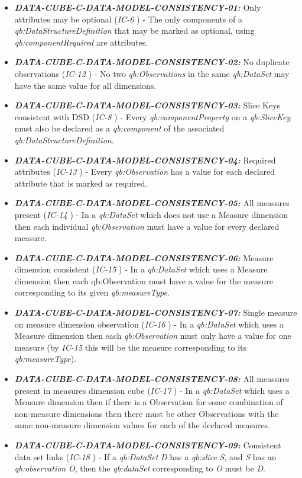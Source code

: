 \documentclass{llncs}
\begin{document}
\begin{itemize}
	\item \textbf{{\em DATA-CUBE-C-DATA-MODEL-CONSISTENCY-01:}}
	Only attributes may be optional (\emph{IC-6} \cite{CyganiakReynolds2014}) - 
	The only components of a \emph{qb:DataStructureDefinition} that may be marked as optional, using \emph{qb:componentRequired} are attributes. 
	\item \textbf{{\em DATA-CUBE-C-DATA-MODEL-CONSISTENCY-02:}}
	No duplicate observations (\emph{IC-12} \cite{CyganiakReynolds2014}) - 
	No two \emph{qb:Observations} in the same \emph{qb:DataSet} may have the same value for all dimensions. 
	\item \textbf{{\em DATA-CUBE-C-DATA-MODEL-CONSISTENCY-03:}}
	Slice Keys consistent with DSD (\emph{IC-8} \cite{CyganiakReynolds2014}) -
	Every \emph{qb:componentProperty} on a \emph{qb:SliceKey} must also be declared as a \emph{qb:component} of the associated \emph{qb:DataStructureDefinition}. 
	\item \textbf{{\em DATA-CUBE-C-DATA-MODEL-CONSISTENCY-04:}}
	Required attributes (\emph{IC-13} \cite{CyganiakReynolds2014}) -
	Every \emph{qb:Observation} has a value for each declared attribute that is marked as required. 
	\item \textbf{{\em DATA-CUBE-C-DATA-MODEL-CONSISTENCY-05:}}
	All measures present (\emph{IC-14} \cite{CyganiakReynolds2014}) -
	In a \emph{qb:DataSet} which does not use a Measure dimension then each individual \emph{qb:Observation} must have a value for every declared measure. 
	\item \textbf{{\em DATA-CUBE-C-DATA-MODEL-CONSISTENCY-06:}}
	Measure dimension consistent (\emph{IC-15} \cite{CyganiakReynolds2014}) -
	In a \emph{qb:DataSet} which uses a Measure dimension then each qb:Observation must have a value for the measure corresponding to its given \emph{qb:measureType}. 
	\item \textbf{{\em DATA-CUBE-C-DATA-MODEL-CONSISTENCY-07:}}
	Single measure on measure dimension observation (\emph{IC-16} \cite{CyganiakReynolds2014}) -
	In a \emph{qb:DataSet} which uses a Measure dimension then each \emph{qb:Observation} must only have a value for one measure (by \emph{IC-15} this will be the measure corresponding to its \emph{qb:measureType}). 
	\item \textbf{{\em DATA-CUBE-C-DATA-MODEL-CONSISTENCY-08:}}
	All measures present in measures dimension cube (\emph{IC-17} \cite{CyganiakReynolds2014}) -
	In a \emph{qb:DataSet} which uses a Measure dimension then if there is a Observation for some combination of non-measure dimensions then there must be other Observations with the same non-measure dimension values for each of the declared measures. 
	\item \textbf{{\em DATA-CUBE-C-DATA-MODEL-CONSISTENCY-09:}}
	Consistent data set links (\emph{IC-18} \cite{CyganiakReynolds2014}) -
	If a \emph{qb:DataSet} \emph{D} has a \emph{qb:slice} \emph{S}, and \emph{S} has an \emph{qb:observation} \emph{O}, then the \emph{qb:dataSet} corresponding to \emph{O} must be \emph{D}. 
\end{itemize}
\end{document}
